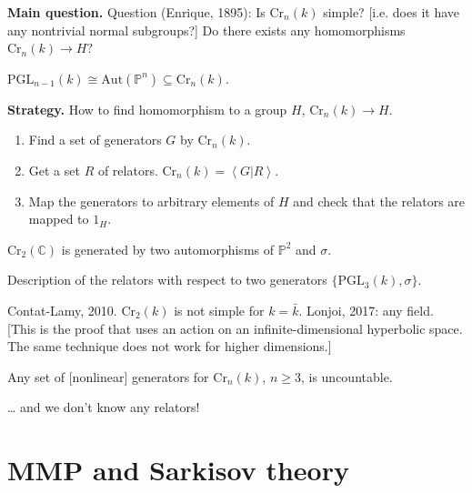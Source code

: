 \medskip\noindent
\textbf{Main question.}
Question (Enrique, 1895):
Is  $\text{Cr}_n(k)$ simple?
[i.e. does it have any nontrivial normal
subgroups?]
Do there exists any homomorphisms
$\text{Cr}_n(k) \to H?$

$\text{PGL}_{n-1}(k) \cong
\text{Aut}(\mathbb{P}^n)
\subseteq \text{Cr}_n(k)$.

\medskip\noindent
\textbf{Strategy.}
How to find homomorphism to a group $H$,
$\text{Cr}_n(k) \to H$.

\begin{enumerate}
\item Find a set of generators $G$ by
$\text{Cr}_n(k)$.

\item Get a set $R$ of relators.
$\text{Cr}_n(k)=\left\langle{}G|R\right\rangle{}$.

\item Map the generators to arbitrary
elements of $H$
and check that the relators are mapped to
$1_H$.
\end{enumerate}

\begin{theorem}
\label{theorem-noether-castelnuovo}
$\text{Cr}_2(\mathbb{C})$ is generated by two
automorphisms of $\mathbb{P}^2$ and $\sigma$.
\end{theorem}

\begin{theorem}[Gizatulin, 1983]
\label{theorem-gizatulin}
Description of the relators with respect to
two generators
$\{\text{PGL}_3(k),\sigma\}$.
\end{theorem}

\begin{remark}
\label{remark-dim-2}
Contat-Lamy, 2010. $\text{Cr}_2(k)$ is not
simple for $k=\bar{k}$.
Lonjoi, 2017: any field.
[This is the proof that uses an action on an
infinite-dimensional hyperbolic space.
The same technique does not work for higher
dimensions.]
\end{remark}

\begin{theorem}
\label{theorem-hudson-pan}
Any set of [nonlinear] generators for
$\text{Cr}_n(k)$, $n\geq 3$,
is uncountable.
\end{theorem}

\noindent
… and we don't know any relators!


\section{MMP and Sarkisov theory}
\label{section-mmp-and-sarkisov}

